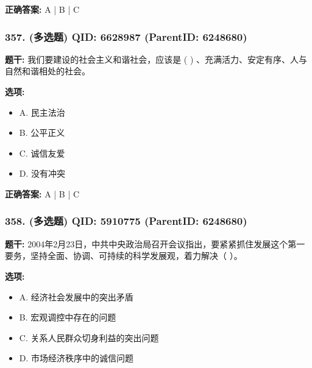 \documentclass[12pt,UTF8]{ctexart}
\begin{document}
\textbf{正确答案:}
A | B | C

\vspace{0.3em}\hrulefill\vspace{0.7em}

\subsubsection*{357. (多选题) \small QID: 6628987 (ParentID: 6248680)}

\textbf{题干:}
我们要建设的社会主义和谐社会，应该是  ( )  、充满活力、安定有序、人与自然和谐相处的社会。



\textbf{选项:}
\begin{itemize}[leftmargin=*]

  \item A. 民主法治

  \item B. 公平正义

  \item C. 诚信友爱

  \item D. 没有冲突

\end{itemize}

\textbf{正确答案:}
A | B | C

\vspace{0.3em}\hrulefill\vspace{0.7em}

\subsubsection*{358. (多选题) \small QID: 5910775 (ParentID: 6248680)}

\textbf{题干:}
2004年2月23日，中共中央政治局召开会议指出，要紧紧抓住发展这个第一要务，坚持全面、协调、可持续的科学发展观，着力解决（ ）。



\textbf{选项:}
\begin{itemize}[leftmargin=*]

  \item A. 经济社会发展中的突出矛盾

  \item B. 宏观调控中存在的问题

  \item C. 关系人民群众切身利益的突出问题

  \item D. 市场经济秩序中的诚信问题

\end{itemize}
\end{document}
